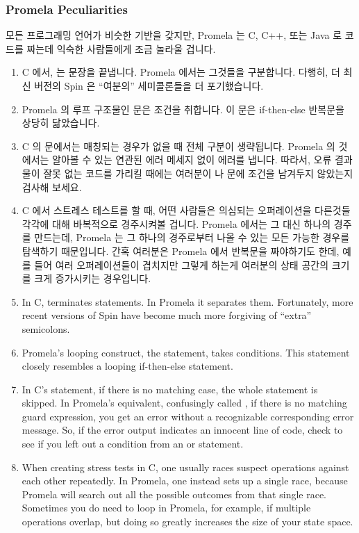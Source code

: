 \subsubsection{Promela Peculiarities}
\label{sec:formal:Promela Peculiarities}

모든 프로그래밍 언어가 비슷한 기반을 갖지만, Promela 는 C, C++, 또는 Java 로
코드를 짜는데 익숙한 사람들에게 조금 놀라울 겁니다.

\iffalse

Although all computer languages have underlying similarities,
Promela will provide some surprises to people used to coding in C,
C++, or Java.

\fi

\begin{enumerate}
\item	C 에서, \qco{;} 는 문장을 끝냅니다.  Promela 에서는 그것들을
	구분합니다.
	다행히, 더 최신 버전의 Spin 은 ``여분의'' 세미콜론들을 더 포기했습니다.
\item	Promela 의 루프 구조물인  문은 조건을 취합니다.
	이  문은 if-then-else 반복문을 상당히 닮았습니다.
\item	C 의  문에서는 매칭되는 경우가 없을 때 전체 구분이
	생략됩니다.  Promela 의 것에서는 알아볼 수 있는 연관된 에러 메세지 없이
	에러를 냅니다.
	따라서, 오류 결과물이 잘못 없는 코드를 가리킬 때에는 여러분이 
	나  문에 조건을 남겨두지 않았는지 검사해 보세요.
\item	C 에서 스트레스 테스트를 할 때, 어떤 사람들은 의심되는 오퍼레이션을
	다른것들 각각에 대해 바복적으로 경주시켜볼 겁니다.  Promela 에서는 그
	대신 하나의 경주를 만드는데, Promela 는 그 하나의 경주로부터 나올 수
	있는 모든 가능한 경우를 탐색하기 때문입니다.  간혹 여러분은 Promela
	에서 반복문을 짜야하기도 한데, 예를 들어 여러 오퍼레이션들이 겹치지만
	그렇게 하는게 여러분의 상태 공간의 크기를 크게 증가시키는 경우입니다.

\iffalse

\item	In C, \qco{;} terminates statements.  In Promela it separates them.
	Fortunately, more recent versions of Spin have become
	much more forgiving of ``extra'' semicolons.
\item	Promela's looping construct, the  statement, takes
	conditions.
	This  statement closely resembles a looping if-then-else
	statement.
\item	In C's  statement, if there is no matching case, the whole
	statement is skipped.  In Promela's equivalent, confusingly called
	, if there is no matching guard expression, you get an error
	without a recognizable corresponding error message.
	So, if the error output indicates an innocent line of code,
	check to see if you left out a condition from an  or 
	statement.
\item	When creating stress tests in C, one usually races suspect operations
	against each other repeatedly.	In Promela, one instead sets up
	a single race, because Promela will search out all the possible
	outcomes from that single race.	Sometimes you do need to loop
	in Promela, for example, if multiple operations overlap, but
	doing so greatly increases the size of your state space.


\end{enumerate}
